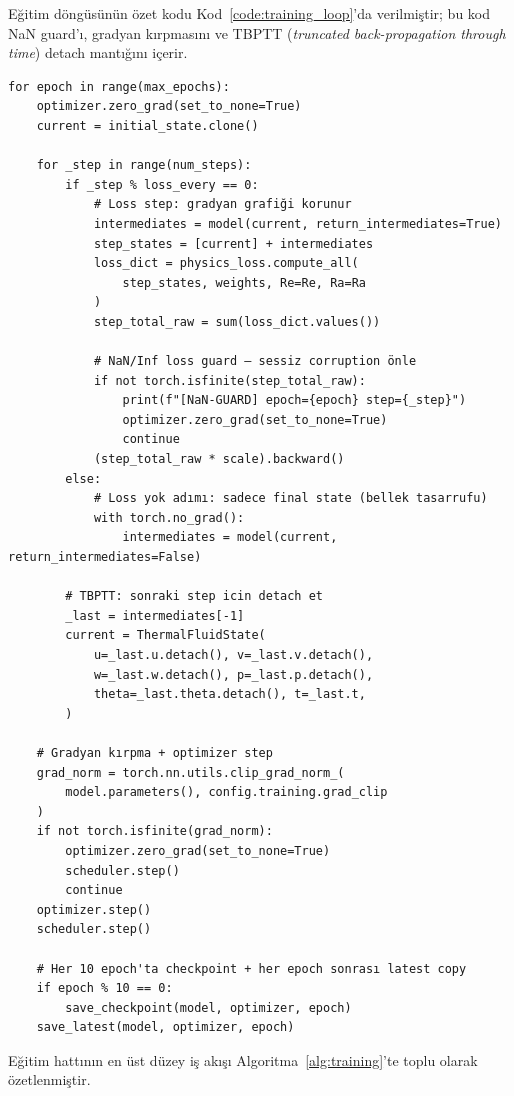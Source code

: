Eğitim döngüsünün özet kodu Kod~\ref{code:training_loop}'da verilmiştir; bu kod NaN guard'ı, gradyan kırpmasını ve TBPTT (\textit{truncated back-propagation through time}) detach mantığını içerir.

\begin{lstlisting}[caption={Eğitim döngüsü --- TBPTT, NaN guard, gradient clip. Tam dosya: \texttt{train.py:2280+}.}, label={code:training_loop}]
for epoch in range(max_epochs):
    optimizer.zero_grad(set_to_none=True)
    current = initial_state.clone()

    for _step in range(num_steps):
        if _step % loss_every == 0:
            # Loss step: gradyan grafiği korunur
            intermediates = model(current, return_intermediates=True)
            step_states = [current] + intermediates
            loss_dict = physics_loss.compute_all(
                step_states, weights, Re=Re, Ra=Ra
            )
            step_total_raw = sum(loss_dict.values())

            # NaN/Inf loss guard — sessiz corruption önle
            if not torch.isfinite(step_total_raw):
                print(f"[NaN-GUARD] epoch={epoch} step={_step}")
                optimizer.zero_grad(set_to_none=True)
                continue
            (step_total_raw * scale).backward()
        else:
            # Loss yok adımı: sadece final state (bellek tasarrufu)
            with torch.no_grad():
                intermediates = model(current, return_intermediates=False)

        # TBPTT: sonraki step icin detach et
        _last = intermediates[-1]
        current = ThermalFluidState(
            u=_last.u.detach(), v=_last.v.detach(),
            w=_last.w.detach(), p=_last.p.detach(),
            theta=_last.theta.detach(), t=_last.t,
        )

    # Gradyan kırpma + optimizer step
    grad_norm = torch.nn.utils.clip_grad_norm_(
        model.parameters(), config.training.grad_clip
    )
    if not torch.isfinite(grad_norm):
        optimizer.zero_grad(set_to_none=True)
        scheduler.step()
        continue
    optimizer.step()
    scheduler.step()

    # Her 10 epoch'ta checkpoint + her epoch sonrası latest copy
    if epoch % 10 == 0:
        save_checkpoint(model, optimizer, epoch)
    save_latest(model, optimizer, epoch)
\end{lstlisting}

Eğitim hattının en üst düzey iş akışı Algoritma~\ref{alg:training}'te toplu olarak özetlenmiştir.

